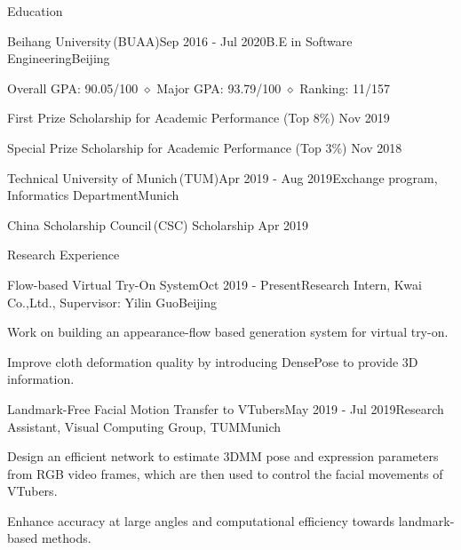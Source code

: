 \documentclass{resume} %
\begin{document}

\begin{rSection}{Education}

\begin{rSubsection}{Beihang University\,(BUAA)}{Sep 2016 - Jul 2020}{B.E in Software Engineering}{Beijing}
    \item Overall GPA: 90.05/100 $\diamond$ Major GPA: 93.79/100 $\diamond$ Ranking: 11/157
    \item First Prize Scholarship for Academic Performance (Top 8\%) \hfill  Nov 2019
    \item Special Prize Scholarship for Academic Performance (Top 3\%) \hfill  Nov 2018 
\end{rSubsection}
\vspace{-0.6em}

\smallskip
\begin{rSubsection}{Technical University of Munich\,(TUM)}{Apr 2019 - Aug 2019}{Exchange program, Informatics Department}{Munich}
    \item China Scholarship Council\,(CSC) Scholarship \hfill Apr 2019
\end{rSubsection}

\end{rSection}



\begin{rSection}{Research Experience}

\begin{rSubsection}{Flow-based Virtual Try-On System}{Oct 2019 - Present}{Research Intern, Kwai Co.,Ltd., Supervisor: Yilin Guo}{Beijing}
\item Work on building an appearance-flow based generation system for virtual try-on.
\item Improve cloth deformation quality by introducing DensePose to provide 3D information.

\end{rSubsection}

\begin{rSubsection}{Landmark-Free Facial Motion Transfer to VTubers}{May 2019 - Jul 2019}{Research Assistant, Visual Computing Group, TUM}{Munich}
\item Design an efficient network to estimate 3DMM pose and expression parameters from RGB video frames, which are then used to control the facial movements of VTubers.
\item Enhance accuracy at large angles and computational efficiency towards landmark-based methods.
\end{rSubsection}

\end{rSection}
\end{document}

